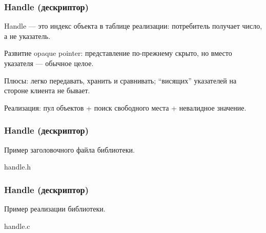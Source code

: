 \documentclass[compress, 8pt, aspectratio=169]{beamer}
\begin{document}
\begin{frame}[fragile]

    \frametitle{Handle (дескриптор)}

    \begin{myitemize}

        \item Handle --- это индекс объекта в таблице реализации:
            потребитель получает число, а не указатель.

        \item Развитие opaque pointer: представление по-прежнему
            скрыто, но вместо указателя --- обычное целое.

        \item Плюсы: легко передавать, хранить и сравнивать;
            \enquote{висящих} указателей на стороне клиента не бывает.

        \item Реализация: пул объектов + поиск свободного места
            + невалидное значение.

    \end{myitemize}

\end{frame}

\begin{frame}[fragile]

    \frametitle{Handle (дескриптор)}

    Пример заголовочного файла библиотеки.

    \bigbreak

        {handle.h}

\end{frame}

\begin{frame}[fragile]

    \frametitle{Handle (дескриптор)}

    Пример реализации библиотеки.

    \bigbreak

        {handle.c}

\end{frame}
\end{document}
